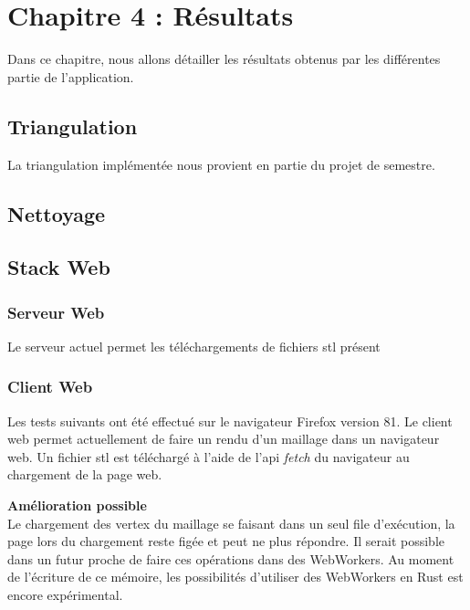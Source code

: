 
\chapter{Chapitre 4 : Résultats}
Dans ce chapitre, nous allons détailler les résultats obtenus par les
différentes partie de l'application.
\section{Triangulation}

La triangulation implémentée nous provient en partie du projet de semestre.

\section{Nettoyage}

\section{Stack Web}
\subsection{Serveur Web}

Le serveur actuel permet les téléchargements de fichiers \gls{stl} présent

\subsection{Client Web}
Les tests suivants ont été effectué sur le navigateur Firefox version 81.
Le client web permet actuellement de faire un rendu d'un maillage dans un
navigateur web. Un fichier \gls{stl} est téléchargé à l'aide de l'api
\textit{fetch} du navigateur au chargement de la page web.

\textbf{Amélioration possible} \\
Le chargement des vertex du maillage se faisant dans un seul file d'exécution,
la page lors du chargement reste figée et peut ne plus répondre. Il serait
possible dans un futur proche de faire ces opérations dans des WebWorkers. Au
moment de l'écriture de ce mémoire, les possibilités d'utiliser des WebWorkers
en Rust est encore expérimental.
